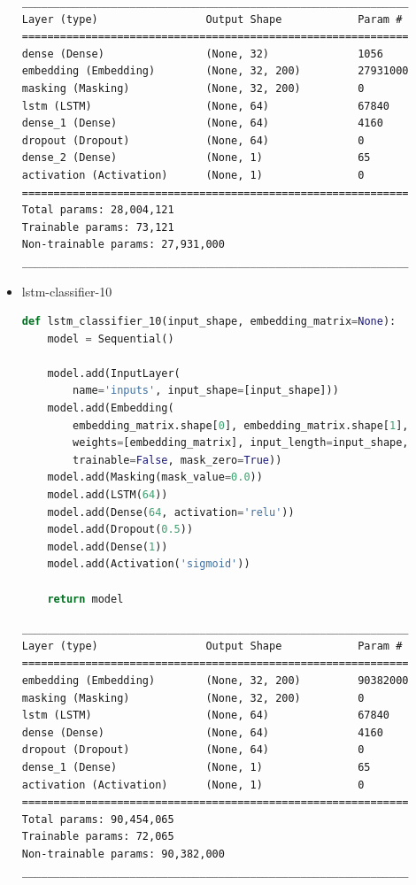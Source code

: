 \documentclass{article}
\begin{document}
\begin{itemize}
\begin{lstlisting}[numbers=none, caption=Обобщение на lstm-classifier-9.]
_____________________________________________________________
Layer (type)                 Output Shape            Param #
=============================================================
dense (Dense)                (None, 32)              1056
embedding (Embedding)        (None, 32, 200)         27931000
masking (Masking)            (None, 32, 200)         0
lstm (LSTM)                  (None, 64)              67840
dense_1 (Dense)              (None, 64)              4160
dropout (Dropout)            (None, 64)              0
dense_2 (Dense)              (None, 1)               65
activation (Activation)      (None, 1)               0
=============================================================
Total params: 28,004,121
Trainable params: 73,121
Non-trainable params: 27,931,000
_____________________________________________________________
\end{lstlisting}

  \item lstm-classifier-10

\begin{lstlisting}[language=Python, caption=Дефиниция на lstm-classifier-10.]
def lstm_classifier_10(input_shape, embedding_matrix=None):
    model = Sequential()

    model.add(InputLayer(
        name='inputs', input_shape=[input_shape]))
    model.add(Embedding(
        embedding_matrix.shape[0], embedding_matrix.shape[1],
        weights=[embedding_matrix], input_length=input_shape,
        trainable=False, mask_zero=True))
    model.add(Masking(mask_value=0.0))
    model.add(LSTM(64))
    model.add(Dense(64, activation='relu'))
    model.add(Dropout(0.5))
    model.add(Dense(1))
    model.add(Activation('sigmoid'))

    return model
\end{lstlisting}

\begin{lstlisting}[numbers=none, caption=Обобщение на lstm-classifier-10.]
_____________________________________________________________
Layer (type)                 Output Shape            Param #
=============================================================
embedding (Embedding)        (None, 32, 200)         90382000
masking (Masking)            (None, 32, 200)         0
lstm (LSTM)                  (None, 64)              67840
dense (Dense)                (None, 64)              4160
dropout (Dropout)            (None, 64)              0
dense_1 (Dense)              (None, 1)               65
activation (Activation)      (None, 1)               0
=============================================================
Total params: 90,454,065
Trainable params: 72,065
Non-trainable params: 90,382,000
_____________________________________________________________
\end{lstlisting}


\end{itemize}
\end{document}
